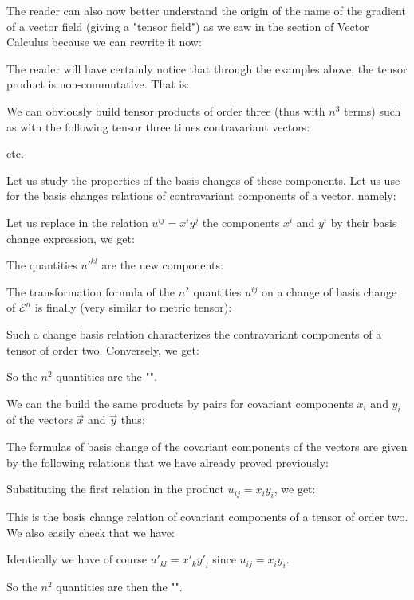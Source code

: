 	The reader can also now better understand the origin of the name of the gradient of a vector field (giving a "tensor field") as we saw in the section of Vector Calculus because we can rewrite it now:
	
	 The reader will have certainly notice that through the examples above, the tensor product is non-commutative. That is:
	
	We can obviously build tensor products of order three (thus with $n^3$ terms) such as with the following tensor three times  contravariant vectors:
	
	etc.

	Let us study the properties of the basis changes of these components. Let us use for the basis changes relations of contravariant components of a vector, namely:
	
	Let us replace in the relation $u^{ij}=x^iy^j$ the components $x^i$ and $y^i$ by their basis change expression, we get:
	
	The quantities ${u'}^{kl}$ are the new components:
	
	The transformation formula of the $n^2$ quantities $u^{ij}$ on a change of basis change of $\mathcal{E}^n$ is finally (very similar to metric tensor):
	
	Such a change basis relation characterizes the contravariant components of a tensor of order two. Conversely, we get:
	
	So the $n^2$ quantities are the "".

	We can the build the same products by pairs for covariant components $x_i$ and $y_i$ of the vectors $\vec{x}$ and $\vec{y}$ thus:
	
	The formulas of basis change of the covariant components of the vectors are given by the following relations that we have already proved previously:
	
	Substituting the first relation in the product $u_{ij}=x_iy_i$, we get:
	
	This is the basis change relation of covariant components of a tensor of order two. We also easily check that we have:
	
	Identically we have of course ${u'}_{kl}={x'}_k{y'}_l$ since $u_{ij}=x_iy_i$.

	So the $n^2$ quantities are then the "".

